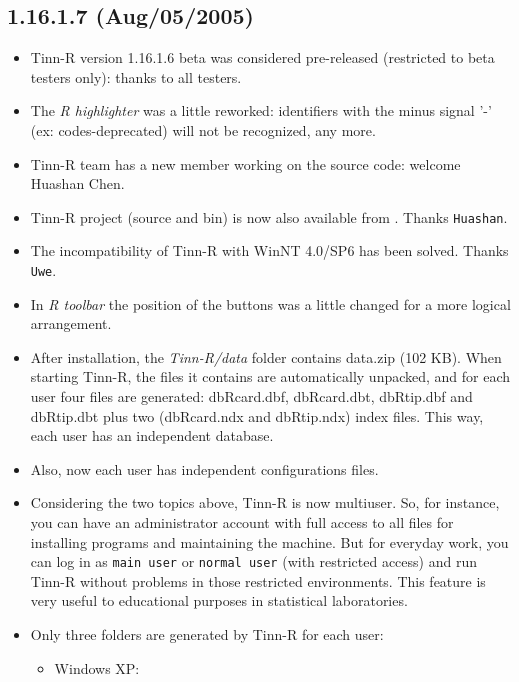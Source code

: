 \subsection*{1.16.1.7 (Aug/05/2005)}
\begin{itemize}
  \item Tinn-R version 1.16.1.6 beta was considered pre-released
    (restricted to beta testers only): thanks to all testers.
  \item The \textit{R highlighter} was a little reworked: identifiers
    with the minus signal '-' (ex: codes-deprecated) will not be
    recognized, any more.
  \item Tinn-R team has a new member working on the source code:
    welcome Huashan Chen.
  \item Tinn-R project (source and bin) is now also available from
    .
    Thanks \texttt{Huashan}.
  \item The incompatibility of Tinn-R with WinNT 4.0/SP6 has been solved.
    Thanks \texttt{Uwe}.
  \item In \textit{R toolbar} the position of the buttons was a little changed
    for a more logical arrangement.
  \item After installation, the \textit{Tinn-R/data} folder contains
    data.zip (102 KB). When starting Tinn-R, the files it contains
    are automatically unpacked, and for each user four files
    are generated: dbRcard.dbf, dbRcard.dbt, dbRtip.dbf and dbRtip.dbt
    plus two (dbRcard.ndx and dbRtip.ndx) index files. This way, each
    user has an independent database.
  \item Also, now each user has independent configurations files.
  \item Considering the two topics above, Tinn-R is now multiuser. So,
    for instance, you can have an administrator account with full access
    to all files for installing programs and maintaining the machine.
    But for everyday work, you can log in as \texttt{main user} or
    \texttt{normal user} (with restricted access) and run Tinn-R
    without problems in those restricted environments. This feature
    is very useful to educational purposes in statistical laboratories.
  \item Only three folders are generated by Tinn-R for each user:
    \begin{itemize}
      \item Windows XP:
        \begin{footnotesize}

\end{footnotesize}
\end{itemize}
\end{itemize}

